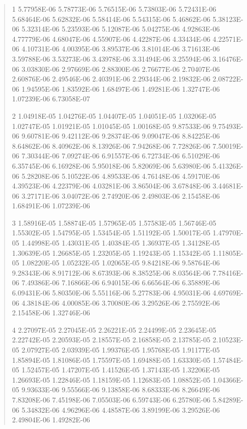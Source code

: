 \documentclass[letterpaper,10pt,english]{sphinxmanual}
\begin{document}
\begin{quote}
\begin{DUlineblock}{0em}
\item[]
\begin{DUlineblock}{\DUlineblockindent}
\item[] 1   5.77958E-06  5.78773E-06  5.76515E-06  5.73803E-06  5.72431E-06  5.68464E-06  5.62832E-06  5.58414E-06  5.54315E-06  5.46862E-06  5.38123E-06  5.32314E-06  5.23593E-06  5.12087E-06  5.04275E-06  4.92863E-06  4.77779E-06  4.68047E-06  4.55907E-06  4.42287E-06  4.33434E-06  4.22571E-06  4.10731E-06  4.00395E-06  3.89537E-06  3.81014E-06  3.71613E-06  3.59788E-06  3.53273E-06  3.43978E-06  3.31494E-06  3.25594E-06  3.16476E-06  3.03830E-06  2.97669E-06  2.88300E-06  2.76677E-06  2.70407E-06  2.60876E-06  2.49546E-06  2.40391E-06  2.29344E-06  2.19832E-06  2.08722E-06  1.94595E-06  1.83592E-06  1.68497E-06  1.49281E-06  1.32747E-06  1.07239E-06  6.73058E-07
\item[] 2   1.04918E-05  1.04276E-05  1.04407E-05  1.04051E-05  1.03206E-05  1.02747E-05  1.01921E-05  1.01045E-05  1.00168E-05  9.87533E-06  9.75493E-06  9.60781E-06  9.42112E-06  9.28374E-06  9.09047E-06  8.84225E-06  8.64862E-06  8.40962E-06  8.13926E-06  7.94268E-06  7.72826E-06  7.50019E-06  7.30344E-06  7.09274E-06  6.91557E-06  6.72734E-06  6.51029E-06  6.35745E-06  6.16928E-06  5.95018E-06  5.82069E-06  5.63980E-06  5.41326E-06  5.28208E-06  5.10522E-06  4.89533E-06  4.76148E-06  4.59170E-06  4.39523E-06  4.22379E-06  4.03281E-06  3.86504E-06  3.67848E-06  3.44681E-06  3.27171E-06  3.04072E-06  2.74920E-06  2.49803E-06  2.15458E-06  1.68491E-06  1.07239E-06
\item[] 3   1.58916E-05  1.58874E-05  1.57965E-05  1.57583E-05  1.56746E-05  1.55302E-05  1.54795E-05  1.53454E-05  1.51192E-05  1.50017E-05  1.47970E-05  1.44998E-05  1.43031E-05  1.40384E-05  1.36937E-05  1.34128E-05  1.30639E-05  1.26685E-05  1.23205E-05  1.19243E-05  1.15342E-05  1.11805E-05  1.08220E-05  1.05232E-05  1.02065E-05  9.84218E-06  9.58764E-06  9.28343E-06  8.91712E-06  8.67393E-06  8.38525E-06  8.03564E-06  7.78416E-06  7.49386E-06  7.16866E-06  6.94015E-06  6.66564E-06  6.35889E-06  6.09431E-06  5.80350E-06  5.55116E-06  5.27783E-06  4.95031E-06  4.69769E-06  4.38184E-06  4.00085E-06  3.70080E-06  3.29526E-06  2.75592E-06  2.15458E-06  1.32746E-06
\item[] 4   2.27097E-05  2.27045E-05  2.26221E-05  2.24499E-05  2.23645E-05  2.22742E-05  2.20593E-05  2.18557E-05  2.16858E-05  2.13785E-05  2.10523E-05  2.07927E-05  2.03939E-05  1.99376E-05  1.95768E-05  1.91177E-05  1.85894E-05  1.81086E-05  1.75597E-05  1.69488E-05  1.63330E-05  1.57484E-05  1.52457E-05  1.47207E-05  1.41526E-05  1.37143E-05  1.32206E-05  1.26693E-05  1.22846E-05  1.18159E-05  1.12683E-05  1.08852E-05  1.04366E-05  9.93633E-06  9.55566E-06  9.13858E-06  8.68333E-06  8.26649E-06  7.83208E-06  7.45198E-06  7.05503E-06  6.59743E-06  6.25780E-06  5.84289E-06  5.34832E-06  4.96296E-06  4.48587E-06  3.89199E-06  3.29526E-06  2.49804E-06  1.49282E-06

\end{DUlineblock}
\end{DUlineblock}
\end{quote}
\end{document}
